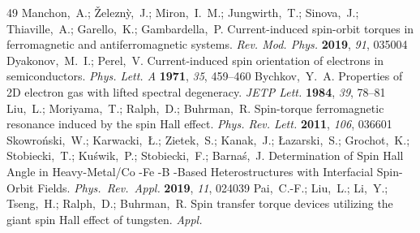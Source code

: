 \documentclass[journal=jacsat,manuscript=article]{achemso}
\begin{document}
\begin{mcitethebibliography}{49}
Manchon,~A.; {\v{Z}}elezn{\`y},~J.; Miron,~I.~M.; Jungwirth,~T.; Sinova,~J.;
  Thiaville,~A.; Garello,~K.; Gambardella,~P. Current-induced spin-orbit
  torques in ferromagnetic and antiferromagnetic systems. \emph{Rev. Mod.
  Phys.} \textbf{2019}, \emph{91}, 035004\relax
\mciteBstWouldAddEndPuncttrue
\mciteSetBstMidEndSepPunct{\mcitedefaultmidpunct}
{\mcitedefaultendpunct}{\mcitedefaultseppunct}\relax
\EndOfBibitem
{}
Dyakonov,~M.~I.; Perel,~V. Current-induced spin orientation of electrons in
  semiconductors. \emph{Phys. Lett. A} \textbf{1971}, \emph{35}, 459--460\relax
\mciteBstWouldAddEndPuncttrue
\mciteSetBstMidEndSepPunct{\mcitedefaultmidpunct}
{\mcitedefaultendpunct}{\mcitedefaultseppunct}\relax
\EndOfBibitem
{}
Bychkov,~Y.~A. Properties of 2D electron gas with lifted spectral degeneracy.
  \emph{JETP Lett.} \textbf{1984}, \emph{39}, 78--81\relax
\mciteBstWouldAddEndPuncttrue
\mciteSetBstMidEndSepPunct{\mcitedefaultmidpunct}
{\mcitedefaultendpunct}{\mcitedefaultseppunct}\relax
\EndOfBibitem
{}
Liu,~L.; Moriyama,~T.; Ralph,~D.; Buhrman,~R. Spin-torque ferromagnetic
  resonance induced by the spin Hall effect. \emph{Phys. Rev. Lett.}
  \textbf{2011}, \emph{106}, 036601\relax
\mciteBstWouldAddEndPuncttrue
\mciteSetBstMidEndSepPunct{\mcitedefaultmidpunct}
{\mcitedefaultendpunct}{\mcitedefaultseppunct}\relax
\EndOfBibitem
{}
{Skowro{\'n}ski},~W.; {Karwacki},~{\L}.; {Zietek},~S.; {Kanak},~J.;
  {{\L}azarski},~S.; {Grochot},~K.; {Stobiecki},~T.; {Ku{\'s}wik},~P.;
  {Stobiecki},~F.; {Barna{\'s}},~J. {Determination of Spin Hall Angle in
  Heavy-Metal/Co -Fe -B -Based Heterostructures with Interfacial Spin-Orbit
  Fields}. \emph{Phys.\ Rev.\ Appl.} \textbf{2019}, \emph{11}, 024039\relax
\mciteBstWouldAddEndPuncttrue
\mciteSetBstMidEndSepPunct{\mcitedefaultmidpunct}
{\mcitedefaultendpunct}{\mcitedefaultseppunct}\relax
\EndOfBibitem
{}
Pai,~C.-F.; Liu,~L.; Li,~Y.; Tseng,~H.; Ralph,~D.; Buhrman,~R. Spin transfer
  torque devices utilizing the giant spin Hall effect of tungsten. \emph{Appl.
}
\end{mcitethebibliography}
\end{document}
